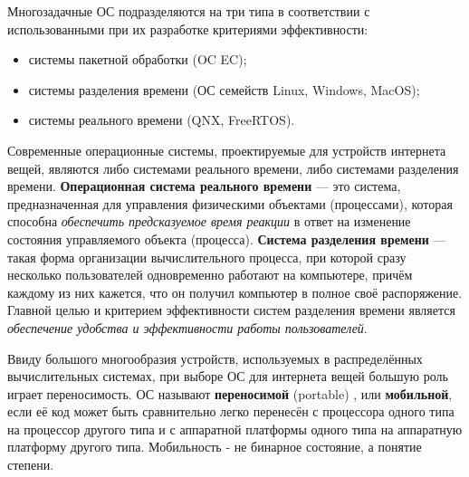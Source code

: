 Многозадачные ОС подразделяются на три типа в соответствии с использованными при их разработке критериями эффективности:
\begin{itemize}
	\item системы пакетной обработки (OC EC);
	\item системы разделения времени (ОС семейств Linux, Windows, MacOS);
	\item системы реального времени (QNX, FreeRTOS).
\end{itemize}
Современные операционные системы, проектируемые для устройств интернета вещей, являются либо системами реального времени, либо системами разделения времени. \textbf{Операционная система реального времени} \cite{Olifer} --- это система, предназначенная для управления физическими объектами (процессами), которая способна \textit{обеспечить предсказуемое время реакции} в ответ на изменение состояния управляемого объекта (процесса). \textbf{Система разделения времени} \cite{Olifer} --- такая форма организации вычислительного процесса, при которой сразу несколько пользователей одновременно работают на компьютере, причём каждому из них кажется, что он получил компьютер в полное своё распоряжение. Главной целью и критерием эффективности систем разделения времени является \textit{обеспечение удобства и эффективности работы пользователей}.

Ввиду большого многообразия устройств, используемых в распределённых вычислительных системах, при выборе ОС для интернета вещей большую роль играет переносимость. ОС называют \textbf{переносимой} (portable) \cite{Olifer}, или \textbf{мобильной}, если её код может быть сравнительно легко перенесён с процессора одного типа на процессор другого типа и с аппаратной платформы одного типа на аппаратную платформу другого типа. Мобильность - не бинарное состояние, а понятие степени.

